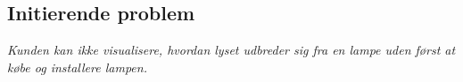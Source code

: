 \subsection{Initierende problem}
\textit{Kunden kan ikke visualisere, hvordan lyset udbreder sig fra en lampe uden først at købe og installere lampen.}
